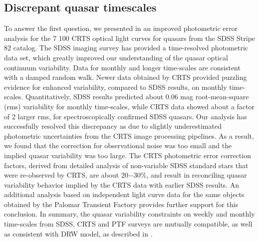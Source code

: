 \documentclass[modern]{aastex62}
\begin{document}
\subsection{Discrepant quasar timescales}
To answer the first question, we presented in \cite{suberlak2017} an improved photometric error analysis for the 7 100 CRTS optical light curves for quasars from the SDSS Stripe 82 catalog. The SDSS imaging survey has provided a time-resolved photometric data set, which greatly improved our understanding of the quasar optical continuum variability. Data for monthly and longer time-scales are consistent with a damped random walk. Newer data obtained by CRTS provided puzzling evidence for enhanced variability, compared to SDSS results, on monthly time-scales. Quantitatively, SDSS results predicted about 0.06 mag root-mean-square (rms) variability for monthly time-scales, while CRTS data showed about a factor of 2 larger rms, for spectroscopically confirmed SDSS quasars. Our analysis has successfully resolved this discrepancy as due to slightly underestimated photometric uncertainties from the CRTS image processing pipelines. As a result, we found that the correction for observational noise was too small and the implied quasar variability was too large. The CRTS photometric error correction factors, derived from detailed analysis of non-variable SDSS standard stars that were re-observed by CRTS, are about $20 \mathrm{-} 30 \%$, and result in reconciling quasar variability behavior implied by the CRTS data with earlier SDSS results. An additional analysis based on independent light curve data for the same objects obtained by the Palomar Transient Factory provides further support for this conclusion. In summary, the quasar variability constraints on weekly and monthly time-scales from SDSS, CRTS and PTF surveys are mutually compatible, as well as consistent with DRW model, as described in \cite{suberlak2017}. 
\end{document}

